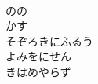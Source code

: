 \documentclass[10pt,b5j]{tarticle} %
\begin{document}
\begin{enumerate}
\begin{minipage}[c]{\blocksize}
        \vspace{\linespace}
        \item~\\
        のの\\
        かす\\
        そぞろきにふるう\\
        よみをにせん\\
        きはめやらず
    
    \end{minipage}
\end{enumerate} %
\end{document}
